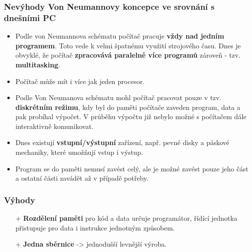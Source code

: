 \subsubsection{Nevýhody Von Neumannovy koncepce ve srovnání s dnešními PC}
\begin{itemize}
\item Podle von Neumannova schématu počítač pracuje \textbf{vždy nad jedním programem}. Toto vede k velmi špatnému využití strojového času. Dnes je obvyklé, že počítač \textbf{zpracovává paralelně více programů} zároveň - tzv. \textbf{multitasking}.
\item Počítač může mít i více jak jeden procesor.
\item Podle Von Neumanova schématu mohl počítač pracovat pouze v tzv. \textbf{diskrétním režimu}, kdy byl do paměti počítače zaveden program, data a pak probíhal výpočet. V průběhu výpočtu již nebylo možné s počítačem dále interaktivně komunikovat.
\item Dnes existují \textbf{vstupní/výstupní} zařízení, např. pevné disky a páskové mechaniky, které umožňují vstup i výstup.
\item Program se do paměti nemusí zavést celý, ale je možné zavést pouze jeho část a ostatní části zavádět až v případě potřeby.
\end{itemize}

\noindent{}

\subsubsection*{Výhody}
\begin{itemize}
	\item[$+$] \textbf{Rozdělení paměti} pro kód a data určuje programátor, řídící jednotka přistupuje pro  data i instrukce jednotným způsobem.
	\item[$+$] \textbf{Jedna sběrnice} ->  jednodušší levnější výroba.
\end{itemize}
